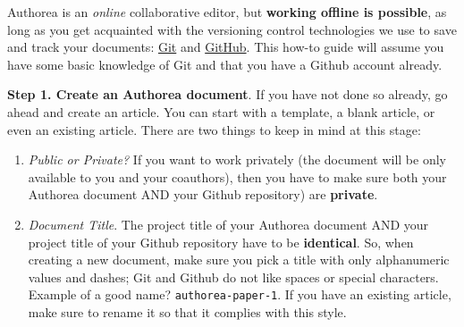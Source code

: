 Authorea is an \textit{online} collaborative editor, but \textbf{working offline is possible}, as long as you get acquainted with the versioning control technologies we use to save and track your documents: \href{http://git-scm.com/}{Git} and \href{http://github.com/}{GitHub}. This how-to guide will assume you have some basic knowledge of Git and that you have a Github account already. 

\textbf{Step 1. Create an Authorea document}. If you have not done so already, go ahead and create an article. You can start with a template, a blank article, or even an existing article. There are two things to keep in mind at this stage:

\begin{enumerate}
\item \textit{Public or Private?} If you want to work privately (the document will be only available to you and your coauthors), then you have to make sure both your Authorea document AND your Github repository) are \textbf{private}.
\item \textit{Document Title}. The project title of your Authorea document AND your project title of your Github repository have to be \textbf{identical}. So, when creating a new document, make sure you pick a title with only alphanumeric values and dashes; Git and Github do not like spaces or special characters. Example of a good name? \verb|authorea-paper-1|. If you have an existing article, make sure to rename it so that it complies with this style.
\end{enumerate}
